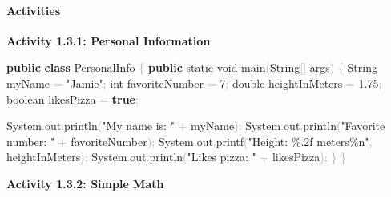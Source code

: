 \documentclass[
  justified,
  openright,
]{tufte-book}
\let\subsection\paragraph
\let\paragraph\paragraph
\newcommand{\KeywordTok}[1]{\textcolor{CodeKeyword}{\textbf{#1}}}  %
\newcommand{\StringTok}[1]{\textcolor{CodeString}{#1}}              %
\newcommand{\CodeNumTok}[1]{\textcolor{CodeNumber}{#1}}             %
\newcommand{\CodeFuncTok}[1]{\textcolor{CodeKeyword}{#1}}           %
\newcommand{\CodeTypeTok}[1]{\textcolor{CodeType}{#1}}              %
\newcommand{\OperatorTok}[1]{\textcolor{DarkGray}{#1}}              %
\newenvironment{Shaded}{%
  \begin{mdframed}[style=TufteCode]%
}{%
  \end{mdframed}%
}
\let\subsection\paragraph
\let\paragraph\paragraph
\begin{document}
\subsection{Activities}\label{activities-13}

\textbf{Activity 1.3.1: Personal Information}

\begin{Shaded}
\begin{Highlighting}[]
\KeywordTok{public} \KeywordTok{class} PersonalInfo \OperatorTok{\{}
    \KeywordTok{public} \CodeTypeTok{static} \CodeTypeTok{void} \CodeFuncTok{main}\OperatorTok{(}String\OperatorTok{[]} args\OperatorTok{)} \OperatorTok{\{}
        String myName \OperatorTok{=} \StringTok{"Jamie"}\OperatorTok{;}
        \CodeTypeTok{int} favoriteNumber \OperatorTok{=} \CodeNumTok{7}\OperatorTok{;}
        \CodeTypeTok{double} heightInMeters \OperatorTok{=} \CodeNumTok{1.75}\OperatorTok{;}
        \CodeTypeTok{boolean} likesPizza \OperatorTok{=} \KeywordTok{true}\OperatorTok{;}
 
        System\OperatorTok{.}\CodeFuncTok{out}\OperatorTok{.}\CodeFuncTok{println}\OperatorTok{(}\StringTok{"My name is: "} \OperatorTok{+} myName\OperatorTok{);}
        System\OperatorTok{.}\CodeFuncTok{out}\OperatorTok{.}\CodeFuncTok{println}\OperatorTok{(}\StringTok{"Favorite number: "} \OperatorTok{+} favoriteNumber\OperatorTok{);}
        System\OperatorTok{.}\CodeFuncTok{out}\OperatorTok{.}\CodeFuncTok{printf}\OperatorTok{(}\StringTok{"Height: }\StringTok{\%.2f}\StringTok{ meters}\StringTok{\%n}\StringTok{"}\OperatorTok{,} heightInMeters\OperatorTok{);}
        System\OperatorTok{.}\CodeFuncTok{out}\OperatorTok{.}\CodeFuncTok{println}\OperatorTok{(}\StringTok{"Likes pizza: "} \OperatorTok{+} likesPizza\OperatorTok{);}
    \OperatorTok{\}}
\OperatorTok{\}}
\end{Highlighting}
\end{Shaded}

\textbf{Activity 1.3.2: Simple Math}
\end{document}
